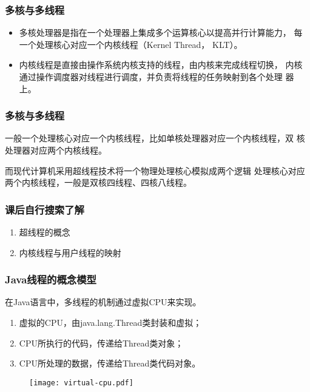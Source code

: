\begin{frame}[fragile]
  \frametitle{多核与多线程}
  \begin{itemize}
  \item 多核处理器是指在一个处理器上集成多个运算核心以提高并行计算能力，
    每一个处理核心对应一个内核线程（Kernel Thread， KLT）。
  \item 内核线程是直接由操作系统内核支持的线程，由内核来完成线程切换，
    内核通过操作调度器对线程进行调度，并负责将线程的任务映射到各个处理
    器上。
  \end{itemize}

\end{frame}

\begin{frame}[fragile]
  \frametitle{多核与多线程}
  一般一个处理核心对应一个内核线程，比如单核处理器对应一个内核线程，双
  核处理器对应两个内核线程。

  {\Red\kai 而现代计算机采用超线程技术将一个物理处理核心模拟成两个逻辑
    处理核心对应两个内核线程，一般是双核四线程、四核八线程。}

  \begin{figure}
\centering
{}
\end{figure}
\end{frame}

\begin{frame}[fragile]
  \frametitle{课后自行搜索了解}
  \begin{enumerate}
  \item 超线程的概念
  \item 内核线程与用户线程的映射
  \end{enumerate}
\end{frame}


\begin{frame}[fragile] %
\frametitle{Java线程的概念模型}

在Java语言中，多线程的机制通过虚拟CPU来实现。

\begin{enumerate}\kai
\item 虚拟的CPU，由java.lang.Thread类封装和虚拟；
\item CPU所执行的代码，传递给Thread类对象；
\item CPU所处理的数据，传递给Thread类代码对象。
\end{enumerate}
\begin{figure}
\centering
\texttt{[image: virtual-cpu.pdf]}
\end{figure}
\end{frame}

